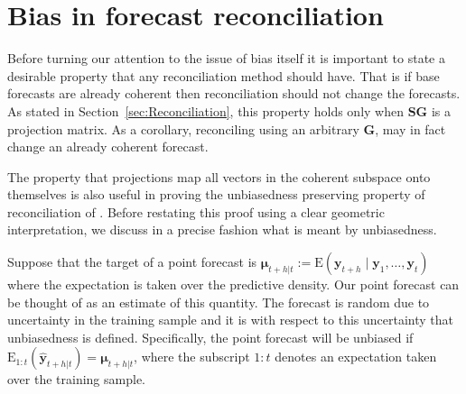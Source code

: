 \documentclass[12pt]{article}
\def\E{\text{E}}
\theoremstyle{definition}
\begin{document}
{%
%

}
\section{Bias in forecast reconciliation}\label{sec:BiasInRecon}

Before turning our attention to the issue of bias itself it is important to state a desirable property that any reconciliation method should have. That is if base forecasts are already coherent then reconciliation should not change the forecasts. As stated in Section~\ref{sec:Reconciliation}, this property holds only when $\bm{S}\bm{G}$ is a projection matrix. As a corollary, reconciling using an arbitrary $\bm{G}$, may in fact change an already coherent forecast.

The property that projections map all vectors in the coherent subspace onto themselves is also useful in proving the unbiasedness preserving property of reconciliation of \citet{WicEtAl2019}. Before restating this proof using a clear geometric interpretation, we discuss in a precise fashion what is meant by unbiasedness.

Suppose that the target of a point forecast is $\bm{\mu}_{t+h|t}:=\E(\bm{y}_{t+h}\mid\bm{y}_{1},\dots,\bm{y}_{t})$ where the expectation is taken over the predictive density. Our point forecast can be thought of as an estimate of this quantity. The forecast is random due to uncertainty in the training sample and it is with respect to this uncertainty that unbiasedness is defined. Specifically, the point forecast will be unbiased if $\E_{1:t}(\hat{\bm{y}}_{t+h|t})=\bm{\mu}_{t+h|t}$, where the subscript $1:t$ denotes an expectation taken over the training sample.
\end{document}

